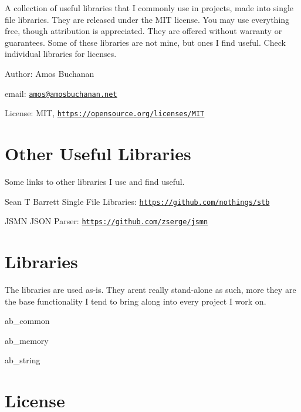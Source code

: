 A collection of useful libraries that I commonly use in projects, made into single file libraries. They are released under the M\+IT license. You may use everything free, though attribution is appreciated. They are offered without warranty or guarantees. Some of these libraries are not mine, but ones I find useful. Check individual libraries for licenses.


\begin{DoxyItemize}
\item Author\+: Amos Buchanan
\item email\+: \href{mailto:amos@amosbuchanan.net}{\tt amos@amosbuchanan.\+net}
\item License\+: M\+IT, \href{https://opensource.org/licenses/MIT}{\tt https\+://opensource.\+org/licenses/\+M\+IT}
\end{DoxyItemize}

\section*{Other Useful Libraries}

Some links to other libraries I use and find useful.


\begin{DoxyItemize}
\item Sean T Barrett Single File Libraries\+: \href{https://github.com/nothings/stb}{\tt https\+://github.\+com/nothings/stb}
\item J\+S\+MN J\+S\+ON Parser\+: \href{https://github.com/zserge/jsmn}{\tt https\+://github.\+com/zserge/jsmn}
\end{DoxyItemize}

\section*{Libraries}

The libraries are used as-\/is. They aren\textquotesingle{}t really stand-\/alone as such, more they are the base functionality I tend to bring along into every project I work on.


\begin{DoxyItemize}
\item ab\+\_\+common
\item ab\+\_\+memory
\item ab\+\_\+string
\end{DoxyItemize}

\section*{License}

